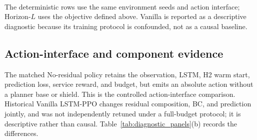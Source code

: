 \documentclass[conference]{IEEEtran}
\begin{document}
\begin{table}[t]
\caption{Coverage across deterministic and learned baselines. Brackets are
hierarchical 95\% CIs; $\pm$ values are evaluation-seed standard deviations.}
\label{tab:baselines}
\centering\tiny\setlength{\tabcolsep}{1.2pt}
\\[-2pt]
\raggedright\footnotesize The deterministic rows use the same environment
seeds and action interface; Horizon-$L$ uses the objective defined above.
Vanilla is reported as a descriptive diagnostic because its training protocol
is confounded, not as a causal baseline.
\end{table}

\subsection{Action-interface and component evidence}
The matched No-residual policy retains the observation, LSTM, H2 warm start,
prediction loss, service reward, and budget, but emits an absolute action
without a planner base or shield. This is the controlled action-interface
comparison. Historical Vanilla LSTM-PPO changes residual composition, BC, and
prediction jointly, and was not independently retuned under a full-budget
protocol; it is descriptive rather than causal. Table~\ref{tab:diagnostic_panels}(b)
records the differences.
\end{document}
